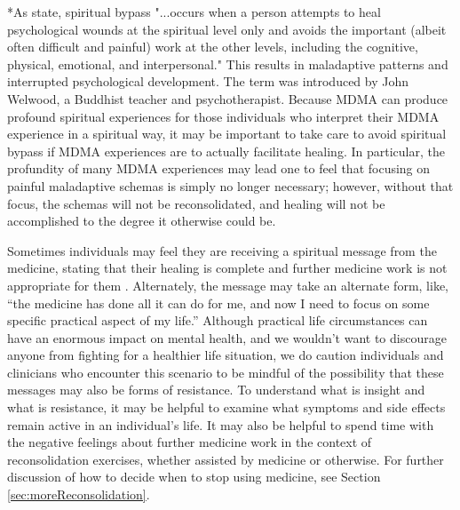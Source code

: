\documentclass[12pt,letterpaper]{article}
\begin{document}
*As \textcite{cashwell2007Bypass} state, spiritual bypass "...occurs when a person attempts to heal psychological wounds at the spiritual level only and avoids the important (albeit often difficult and painful) work at the other levels, including the cognitive, physical, emotional, and interpersonal." This results in maladaptive patterns and interrupted psychological development. The term was introduced by John Welwood, a Buddhist teacher and psychotherapist. Because MDMA can produce profound spiritual experiences for those individuals who interpret their MDMA experience in a spiritual way, it may be important to take care to avoid spiritual bypass if MDMA experiences are to actually facilitate healing. In particular, the profundity of many MDMA experiences may lead one to feel that focusing on painful maladaptive schemas is simply no longer necessary; however, without that focus, the schemas will not be reconsolidated, and healing will not be accomplished to the degree it otherwise could be.

Sometimes individuals may feel they are receiving a spiritual message from the medicine, stating that their healing is complete and further medicine work is not appropriate for them \cite{razviDissociation}. Alternately, the message may take an alternate form, like, “the medicine has done all it can do for me, and now I need to focus on some specific practical aspect of my life.”  Although practical life circumstances can have an enormous impact on mental health, and we wouldn't want to discourage anyone from fighting for a healthier life situation, we do caution individuals and clinicians who encounter this scenario to be mindful of the possibility that these messages may also be forms of resistance. To understand what is insight and what is resistance, it may be helpful to examine what symptoms and side effects remain active in an individual's life. It may also be helpful to spend time with the negative feelings about further medicine work in the context of reconsolidation exercises, whether assisted by medicine or otherwise. For further discussion of how to decide when to stop using medicine, see Section \ref{sec:moreReconsolidation}.
\end{document}
